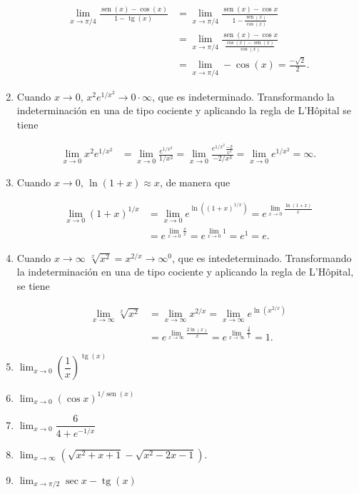\documentclass[
  a4paper,
]{scrreport}
\theoremstyle{definition}
\theoremstyle{remark}
\begin{document}
\begin{tcolorbox}
\begin{enumerate}
  \begin{align*}
   \lim_{x\to \pi/4}\frac{\operatorname{sen}(x)-\cos(x)}{1-\operatorname{tg}(x)} &= \lim_{x\to \pi/4}\frac{\operatorname{sen}(x)-\cos x}{1-\frac{\operatorname{sen}(x)}{\cos(x)}}\\ 
   & = \lim_{x\to \pi/4}\frac{\operatorname{sen}(x)-\cos x}{\frac{\cos(x)-\operatorname{sen}(x)}{\cos(x)}}\\ 
   & = \lim_{x\to \pi/4} -\cos(x) = \frac{-\sqrt{2}}{2}.
   \end{align*}
\item
  Cuando \(x\to 0\), \(x^2e^{1/x^2}\to 0\cdot \infty\), que es
  indeterminado. Transformando la indeterminación en una de tipo
  cociente y aplicando la regla de L'Hôpital se tiene

  \begin{align*}
   \lim_{x\to 0}x^2e^{1/x^2} &= \lim_{x\to 0}\frac{e^{1/x^2}}{1/x^2} = \lim_{x\to 0}\frac{e^{1/x^2}\frac{-2}{x^3}}{-2/x^3} = \lim_{x\to 0} e^{1/x^2} =\infty.
   \end{align*}
\item
  Cuando \(x\to 0\), \(\ln(1+x)\approx x\), de manera que

  \begin{align*}
   \lim_{x\to 0}\left(1+x\right)^{1/x} &= \lim_{x\to 0}e^{\ln(\left(1+x\right)^{1/x})} = e^{\lim_{x\to 0}\frac{\ln(1+x)}{x}}\\  
   &= e^{\lim_{x\to 0}\frac{x}{x}} = e^{\lim_{x\to 0}1} = e^1 = e.
   \end{align*}
\item
  Cuando \(x\to\infty\) \(\sqrt[x]{x^2}=x^{2/x}\to \infty^0\), que es
  intedeterminado. Transformando la indeterminación en una de tipo
  cociente y aplicando la regla de L'Hôpital, se tiene

  \begin{align*}
   \lim_{x\to \infty} \sqrt[x]{x^2} 
   &= \lim_{x\to \infty} x^{2/x} = \lim_{x\to \infty} e^{\ln(x^{2/x})}\\
   & = e^{\lim_{x\to \infty} \frac{2\ln(x)}{x}} = e^{\lim_{x\to \infty} \frac{\frac{2}{x}}{1}} = 1.
   \end{align*}
\item
  \(\displaystyle \lim_{x\to 0}\left(\dfrac{1}{x}\right)^{\operatorname{tg}(x)}\)
\item
  \(\displaystyle \lim_{x\to 0}(\cos x)^{1/\operatorname{sen}(x)}\)
\item
  \(\displaystyle \lim_{x\to 0}\dfrac{6}{4+e^{-1/x}}\)
\item
  \(\displaystyle \lim_{x\to \infty}\left(\sqrt{x^2+x+1}-\sqrt{x^2-2x-1}\right)\).
\item
  \(\displaystyle \lim_{x\to \pi/2}\sec x-\operatorname{tg}(x)\)
\end{enumerate}

\end{tcolorbox}
\end{document}
